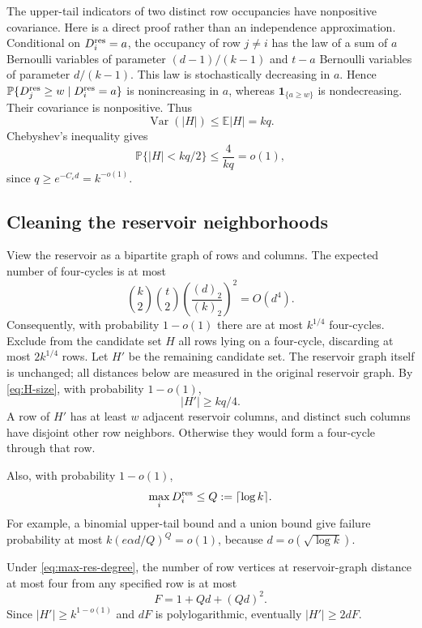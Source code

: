 \documentclass[11pt]{article}
\theoremstyle{definition}
\theoremstyle{remark}
\newcommand{\PP}{\mathbb P}
\newcommand{\EE}{\mathbb E}
\newcommand{\Var}{\operatorname{Var}}
\newcommand{\abs}[1]{\left\lvert #1\right\rvert}
\newcommand{\ind}{\mathbf 1}
\begin{document}
The upper-tail indicators of two distinct row occupancies have nonpositive covariance. Here is a direct proof rather than an independence approximation. Conditional on $D_i^{\rm res}=a$, the occupancy of row $j\ne i$ has the law of a sum of $a$ Bernoulli variables of parameter $(d-1)/(k-1)$ and $t-a$ Bernoulli variables of parameter $d/(k-1)$. This law is stochastically decreasing in $a$. Hence
$\PP\{D_j^{\rm res}\geq w\mid D_i^{\rm res}=a\}$ is nonincreasing in $a$, whereas $\ind_{\{a\geq w\}}$ is nondecreasing. Their covariance is nonpositive. Thus
\[
 \Var(\abs H)\leq\EE\abs H=kq.
\]
Chebyshev's inequality gives
\begin{equation}\label{eq:H-size}
 \PP\{\abs H<kq/2\}\leq\frac4{kq}=o(1),
\end{equation}
since $q\geq e^{-C_\varepsilon d}=k^{-o(1)}$.

\subsection{Cleaning the reservoir neighborhoods}

View the reservoir as a bipartite graph of rows and columns. The expected number of four-cycles is at most
\[
 {k\choose2}{t\choose2}
 \left(\frac{(d)_2}{(k)_2}\right)^2=O(d^4).
\]
Consequently, with probability $1-o(1)$ there are at most $k^{1/4}$ four-cycles. Exclude from the candidate set $H$ all rows lying on a four-cycle, discarding at most $2k^{1/4}$ rows. Let $H'$ be the remaining candidate set. The reservoir graph itself is unchanged; all distances below are measured in the original reservoir graph. By \eqref{eq:H-size}, with probability $1-o(1)$,
\begin{equation}\label{eq:H-prime}
 \abs{H'}\geq kq/4.
\end{equation}
A row of $H'$ has at least $w$ adjacent reservoir columns, and distinct such columns have disjoint other row neighbors. Otherwise they would form a four-cycle through that row.

Also, with probability $1-o(1)$,
\begin{equation}\label{eq:max-res-degree}
 \max_i D_i^{\rm res}\leq Q:=\lceil\log k\rceil.
\end{equation}
For example, a binomial upper-tail bound and a union bound give failure probability at most
$k(e\alpha d/Q)^Q=o(1)$, because $d=o(\sqrt{\log k})$.

Under \eqref{eq:max-res-degree}, the number of row vertices at reservoir-graph distance at most four from any specified row is at most
\begin{equation}\label{eq:F}
 F=1+Qd+(Qd)^2.
\end{equation}
Since $\abs{H'}\geq k^{1-o(1)}$ and $dF$ is polylogarithmic, eventually $\abs{H'}\geq2dF$.
\end{document}

